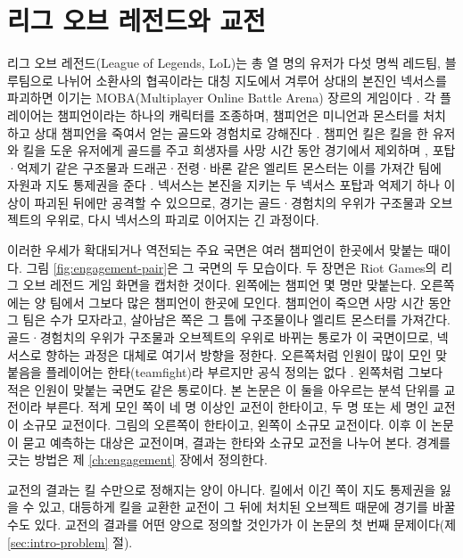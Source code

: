 \section{리그 오브 레전드와 교전}
\label{sec:intro-game}

리그 오브 레전드(League of Legends, LoL)는 총 열 명의 유저가 다섯 명씩 레드팀, 블루팀으로 나뉘어 소환사의 협곡이라는 대칭 지도에서 겨루어 상대의 본진인 넥서스를 파괴하면 이기는 MOBA(Multiplayer Online Battle Arena) 장르의 게임이다 \cite{riotapi2024matchv5,lolwiki2025summonersrift,lolwiki2026nexus}. 각 플레이어는 챔피언이라는 하나의 캐릭터를 조종하며, 챔피언은 미니언과 몬스터를 처치하고 상대 챔피언을 죽여서 얻는 골드와 경험치로 강해진다 \cite{lolwiki2026champion,lolwiki2026gold,lolwiki2026experience}. 챔피언 킬은 킬을 한 유저와 킬을 도운 유저에게 골드를 주고 희생자를 사망 시간 동안 경기에서 제외하며 \cite{lolwiki2026kill,lolwiki2026assist,lolwiki2026death}, 포탑·억제기 같은 구조물과 드래곤·전령·바론 같은 엘리트 몬스터는 이를 가져간 팀에 자원과 지도 통제권을 준다 \cite{lolwiki2026turret,lolwiki2026inhibitor,lolwiki2026dragonpit,lolwiki2026riftherald,lolwiki2026baron}. 넥서스는 본진을 지키는 두 넥서스 포탑과 억제기 하나 이상이 파괴된 뒤에만 공격할 수 있으므로, 경기는 골드·경험치의 우위가 구조물과 오브젝트의 우위로, 다시 넥서스의 파괴로 이어지는 긴 과정이다.

이러한 우세가 확대되거나 역전되는 주요 국면은 여러 챔피언이 한곳에서 맞붙는 때이다. 그림 \ref{fig:engagement-pair}은 그 국면의 두 모습이다. 두 장면은 Riot Games의 리그 오브 레전드 게임 화면을 캡처한 것이다. 왼쪽에는 챔피언 몇 명만 맞붙는다. 오른쪽에는 양 팀에서 그보다 많은 챔피언이 한곳에 모인다. 챔피언이 죽으면 사망 시간 동안 그 팀은 수가 모자라고, 살아남은 쪽은 그 틈에 구조물이나 엘리트 몬스터를 가져간다. 골드·경험치의 우위가 구조물과 오브젝트의 우위로 바뀌는 통로가 이 국면이므로, 넥서스로 향하는 과정은 대체로 여기서 방향을 정한다. 오른쪽처럼 인원이 많이 모인 맞붙음을 플레이어는 한타(teamfight)라 부르지만 공식 정의는 없다 \cite{lolwiki2026terminology}. 왼쪽처럼 그보다 적은 인원이 맞붙는 국면도 같은 통로이다. 본 논문은 이 둘을 아우르는 분석 단위를 교전이라 부른다. 적게 모인 쪽이 네 명 이상인 교전이 한타이고, 두 명 또는 세 명인 교전이 소규모 교전이다. 그림의 오른쪽이 한타이고, 왼쪽이 소규모 교전이다. 이후 이 논문이 묻고 예측하는 대상은 교전이며, 결과는 한타와 소규모 교전을 나누어 본다. 경계를 긋는 방법은 제 \ref{ch:engagement} 장에서 정의한다.



교전의 결과는 킬 수만으로 정해지는 양이 아니다. 킬에서 이긴 쪽이 지도 통제권을 잃을 수 있고, 대등하게 킬을 교환한 교전이 그 뒤에 처치된 오브젝트 때문에 경기를 바꿀 수도 있다. 교전의 결과를 어떤 양으로 정의할 것인가가 이 논문의 첫 번째 문제이다(제 \ref{sec:intro-problem} 절).

